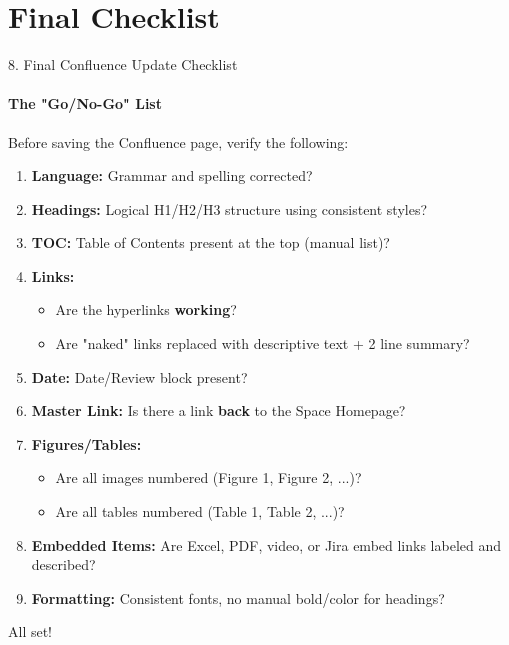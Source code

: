 \documentclass[10pt, aspectratio=169]{beamer}
\begin{document}
	\section{Final Checklist}
	\begin{frame}{8. Final Confluence Update Checklist}
		\framesubtitle{The "Go/No-Go" List}
		Before saving the Confluence page, verify the following:
		
		\pause
		\begin{enumerate}
			\item \textbf{Language:} Grammar and spelling corrected?
			\item \textbf{Headings:} Logical H1/H2/H3 structure using consistent styles?
			\item \textbf{TOC:} Table of Contents present at the top (manual list)?
			\item \textbf{Links:} 
			\begin{itemize}
				\item Are the hyperlinks \textbf{working}?
				\item Are "naked" links replaced with descriptive text + 2 line summary?
			\end{itemize}
			\item \textbf{Date:} Date/Review block present?
			\item \textbf{Master Link:} Is there a link \textbf{back} to the Space Homepage?
			\item \textbf{Figures/Tables:} 
			\begin{itemize}
				\item Are all images numbered (Figure 1, Figure 2, ...)?
				\item Are all tables numbered (Table 1, Table 2, ...)?
			\end{itemize}
			\item \textbf{Embedded Items:} Are Excel, PDF, video, or Jira embed links labeled and described?
			\item \textbf{Formatting:} Consistent fonts, no manual bold/color for headings?
		\end{enumerate}
		
		\vfill
		\pause
		\begin{center}
			\color{blue} \Huge \checkmark \quad All set!
		\end{center}
	\end{frame}
	
\end{document}
